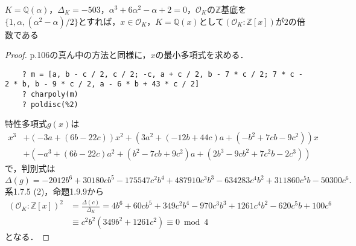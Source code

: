 \begin{screen}
  $K=\mathbb{Q}(\alpha)$，$\varDelta_K=-503$，$\alpha^3+6\alpha^2-\alpha+2=0$，$\mathcal{O}_K$の$\mathbb{Z}$基底を$\{1, \alpha, (\alpha^2-\alpha)/2\}$とすれば，$x\in\mathcal{O}_K$，$K=\mathbb{Q}(x)$として$(\mathcal{O}_K:\mathbb{Z}[x])$が$2$の倍数である
\end{screen}
\begin{proof}

  p.106の真ん中の方法と同様に，$x$の最小多項式を求める．
  \begin{lstlisting}
    ? m = [a, b - c / 2, c / 2; -c, a + c / 2, b - 7 * c / 2; 7 * c - 2 * b, b - 9 * c / 2, a - 6 * b + 43 * c / 2]
    ? charpoly(m)
    ? poldisc(%2)
  \end{lstlisting}
  特性多項式$g(x)$は
  \begin{align*}
    x^3 &+ (-3a + (6b - 22c))x^2 + (3a^2 + (-12b + 44c)a + (-b^2 + 7cb - 9c^2))x \\
        &+ (-a^3 + (6b - 22c)a^2 + (b^2 - 7cb + 9c^2)a + (2b^3 - 9cb^2 + 7c^2b - 2c^3))
  \end{align*}
  で，判別式は
  \[\varDelta(g)=-2012b^6 + 30180cb^5 - 175547c^2b^4 + 487910c^3b^3 - 634283c^4b^2 + 311860c^5b - 50300c^6.\]
  系1.7.5 (2)，命題1.9.9から
  \begin{align*}
    (\mathcal{O}_K:\mathbb{Z}[x])^2 &= \frac{\varDelta(c)}{\varDelta_K} = 4b^6+60cb^5+349c^2b^4-970c^3b^3+1261c^4b^2-620c^5b+100c^6\\
    &\equiv c^2b^2(349b^2+1261c^2)\equiv0\bmod4
  \end{align*}
  となる．
\end{proof}


